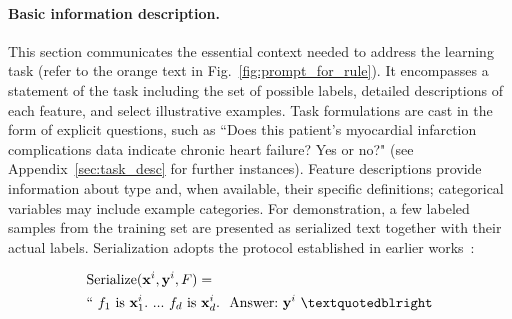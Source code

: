 \vspace*{-0.12in}
\paragraph{Basic information description.} This section communicates the essential context needed to address the learning task (refer to the orange text in Fig.~\ref{fig:prompt_for_rule}). It encompasses a statement of the task including the set of possible labels, detailed descriptions of each feature, and select illustrative examples. Task formulations are cast in the form of explicit questions, such as ``Does this patient's myocardial infarction complications data indicate chronic heart failure? Yes or no?" (see Appendix~\ref{sec:task_desc} for further instances). Feature descriptions provide information about type and, when available, their specific definitions; categorical variables may include example categories. For demonstration, a few labeled samples from the training set are presented as serialized text together with their actual labels. Serialization adopts the protocol established in earlier works~\cite{dinh2022lift,hegselmann2023tabllm}:

\begin{align}
&\text{Serialize}(\mathbf{x}^i,\mathbf{y}^i, F) = \nonumber \\ 
&``\ f_1\ \text{is}\ \mathbf{x}^i_1.\ ... \ f_d\  \text{is}\  \mathbf{x}^i_d.\ \ \text{Answer:}\  \mathbf{y}^i\ ”
\end{align}

\vspace*{-0.12in}
